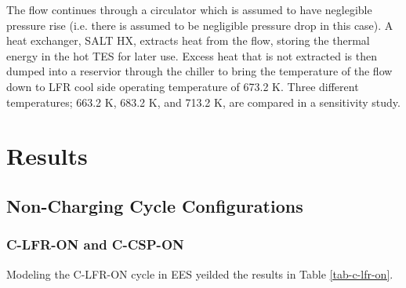 \begin{paracol}{2}
\linenumbers
\switchcolumn

The flow continues through a circulator which is assumed to have neglegible pressure rise (i.e. there is assumed to be negligible pressure drop in this case). A heat exchanger, SALT HX, extracts heat from the flow, storing the thermal energy in the hot TES for later use. Excess heat that is not extracted is then dumped into a reservior through the chiller to bring the temperature of the flow down to LFR cool side operating temperature of 673.2 K. Three different temperatures; 663.2 K, 683.2 K, and 713.2 K, are compared in a sensitivity study. 



\section{Results}


\subsection{Non-Charging Cycle Configurations}

\subsubsection{C-LFR-ON and C-CSP-ON}

Modeling the C-LFR-ON cycle in EES yeilded the results in Table \ref{tab-c-lfr-on}. 


\end{paracol}
